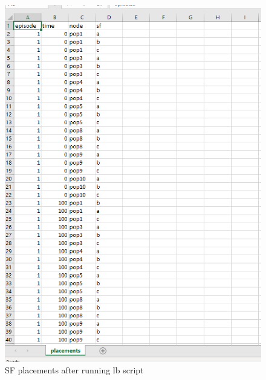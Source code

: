 \begin{figure}[h]
    \centering
    \includegraphics[width=1\textwidth]{lbplacements}
    \caption{SF placements after running lb script}
    \label{fig:lbplacements}
\end{figure}


